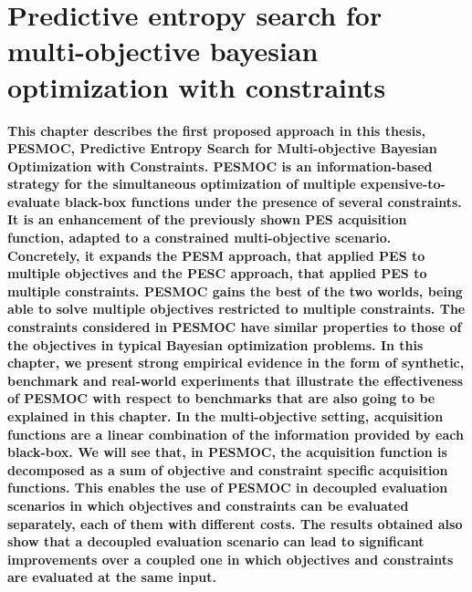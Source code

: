 
\chapter{Predictive entropy search for multi-objective bayesian optimization with constraints} %
\label{Chapter4}

{\bf \small{
This chapter describes the first proposed approach in this thesis, PESMOC, Predictive Entropy Search for Multi-objective Bayesian Optimization with Constraints. PESMOC is an information-based strategy for the simultaneous optimization of multiple expensive-to-evaluate black-box functions under the presence of several constraints. It is an enhancement of the previously shown PES acquisition function, adapted to a constrained multi-objective scenario. Concretely, it expands the PESM approach, that applied PES to multiple objectives and the PESC approach, that applied PES to multiple constraints. PESMOC gains the best of the two worlds, being able to solve multiple objectives restricted to multiple constraints. The constraints considered in PESMOC have similar properties to those of the objectives in typical Bayesian optimization problems. In this chapter, we present strong empirical evidence in the form of synthetic, benchmark and real-world experiments that illustrate the effectiveness of PESMOC with respect to benchmarks that are also going to be explained in this chapter. In the multi-objective setting, acquisition functions are a linear combination of the information provided by each black-box. We will see that, in PESMOC, the acquisition function is decomposed as a sum of objective and constraint specific acquisition functions. This enables the use of PESMOC in decoupled evaluation scenarios in which objectives and constraints can be evaluated separately, each of them with different costs. The results obtained also show that a decoupled evaluation scenario can lead to significant improvements over a coupled one in which objectives and constraints are evaluated at the same input.
}}

